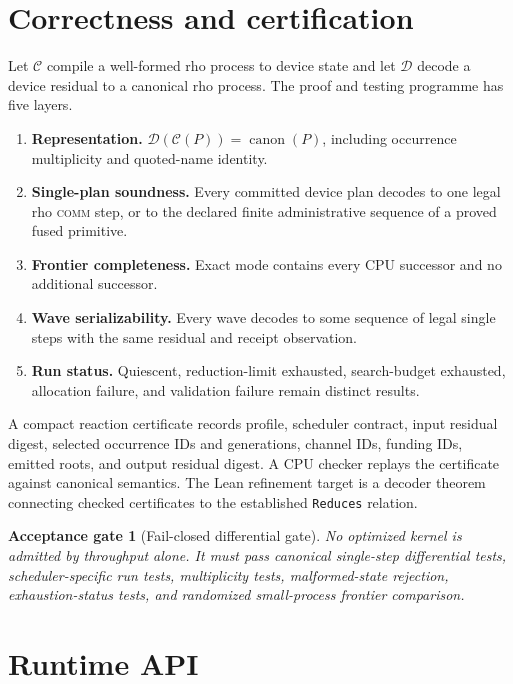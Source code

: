 \documentclass[11pt]{article}
\newtheorem{acceptance}[requirement]{Acceptance gate}
\newcommand{\COMM}{\textsc{comm}}
\newcommand{\code}[1]{\texttt{#1}}
\begin{document}
\section{Correctness and certification}

Let $\mathcal{C}$ compile a well-formed rho process to device state and let
$\mathcal{D}$ decode a device residual to a canonical rho process.  The proof
and testing programme has five layers.

\begin{enumerate}
\item \textbf{Representation.}
  $\mathcal{D}(\mathcal{C}(P))=\operatorname{canon}(P)$, including occurrence
  multiplicity and quoted-name identity.
\item \textbf{Single-plan soundness.}
  Every committed device plan decodes to one legal rho \COMM{} step, or to the
  declared finite administrative sequence of a proved fused primitive.
\item \textbf{Frontier completeness.}
  Exact mode contains every CPU successor and no additional successor.
\item \textbf{Wave serializability.}
  Every wave decodes to some sequence of legal single steps with the same
  residual and receipt observation.
\item \textbf{Run status.}
  Quiescent, reduction-limit exhausted, search-budget exhausted, allocation
  failure, and validation failure remain distinct results.
\end{enumerate}

A compact reaction certificate records profile, scheduler contract, input
residual digest, selected occurrence IDs and generations, channel IDs,
funding IDs, emitted roots, and output residual digest.  A CPU checker replays
the certificate against canonical semantics.  The Lean refinement target is
a decoder theorem connecting checked certificates to the established
\code{Reduces} relation.

\begin{acceptance}[Fail-closed differential gate]
No optimized kernel is admitted by throughput alone.  It must pass canonical
single-step differential tests, scheduler-specific run tests, multiplicity
tests, malformed-state rejection, exhaustion-status tests, and randomized
small-process frontier comparison.
\end{acceptance}

\section{Runtime API}
\end{document}
